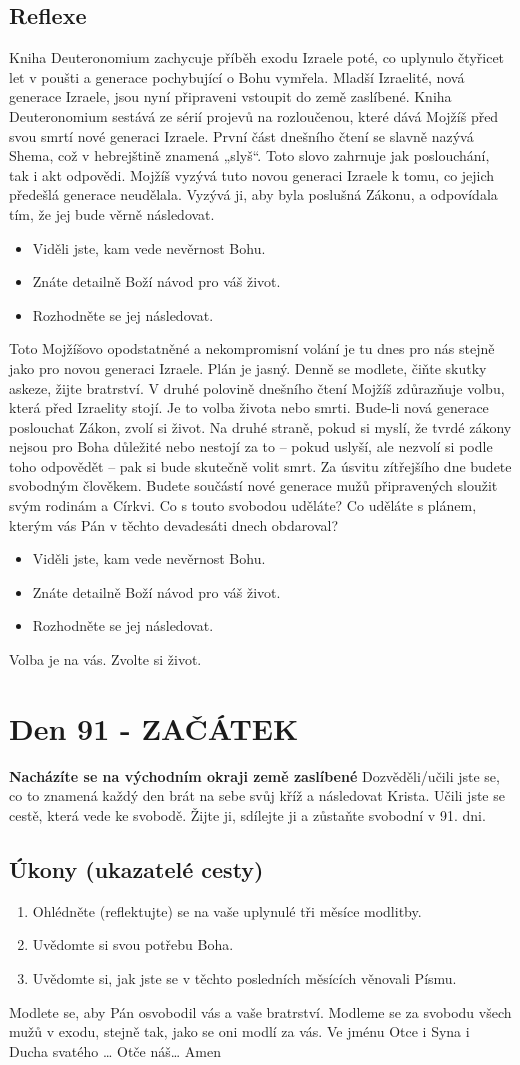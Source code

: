 \documentclass[11pt]{article}
\newcommand{\zacatekTrinactyTyden}{
\textbf{Nacházíte se na východním okraji země zaslíbené} \newline 
Dozvěděli/učili jste se, co to znamená každý den brát na sebe svůj kříž a následovat Krista. Učili jste se cestě, která vede ke svobodě. Žijte ji, sdílejte ji a zůstaňte svobodní v 91. dni.

\subsection*{Úkony (ukazatelé cesty)}
\begin{enumerate}
  \item Ohlédněte (reflektujte) se na vaše uplynulé tři měsíce modlitby.
  \item Uvědomte si svou potřebu Boha.
  \item Uvědomte si, jak jste se v těchto posledních měsících věnovali Písmu.
\end{enumerate}
Modlete se, aby Pán osvobodil vás a vaše bratrství. \newline
Modleme se za svobodu všech mužů v exodu, stejně tak, jako se oni modlí za vás.\newline
Ve jménu Otce i Syna i Ducha svatého …  Otče náš… Amen
}
\begin{document}
\subsection*{Reflexe}
Kniha Deuteronomium zachycuje příběh exodu Izraele poté, co uplynulo čtyřicet let v poušti a generace
pochybující o Bohu vymřela. Mladší Izraelité, nová generace Izraele, jsou nyní připraveni vstoupit do země
zaslíbené. Kniha Deuteronomium sestává ze sérií projevů na rozloučenou, které dává Mojžíš před svou smrtí
nové generaci Izraele.
První část dnešního čtení se slavně nazývá Shema, což v hebrejštině znamená „slyš“. Toto slovo zahrnuje jak
poslouchání, tak i akt odpovědi. Mojžíš vyzývá tuto novou generaci Izraele k tomu, co jejich předešlá
generace neudělala. Vyzývá ji, aby byla poslušná Zákonu, a odpovídala tím, že jej bude věrně následovat.
\begin{itemize}
  \item Viděli jste, kam vede nevěrnost Bohu.
  \item Znáte detailně Boží návod pro váš život.
  \item Rozhodněte se jej následovat.
\end{itemize}

Toto Mojžíšovo opodstatněné a nekompromisní volání je tu dnes pro nás stejně jako pro novou generaci
Izraele. Plán je jasný. Denně se modlete, čiňte skutky askeze, žijte bratrství.
V druhé polovině dnešního čtení Mojžíš zdůrazňuje volbu, která před Izraelity stojí. Je to volba života nebo
smrti. Bude-li nová generace poslouchat Zákon, zvolí si život. Na druhé straně, pokud si myslí, že tvrdé
zákony nejsou pro Boha důležité nebo nestojí za to – pokud uslyší, ale nezvolí si podle toho odpovědět – pak
si bude skutečně volit smrt.
Za úsvitu zítřejšího dne budete svobodným člověkem. Budete součástí nové generace mužů připravených
sloužit svým rodinám a Církvi. Co s touto svobodou uděláte? Co uděláte s plánem, kterým vás Pán v těchto
devadesáti dnech obdaroval?
\begin{itemize}
  \item Viděli jste, kam vede nevěrnost Bohu.
  \item Znáte detailně Boží návod pro váš život.
  \item Rozhodněte se jej následovat.
\end{itemize}
Volba je na vás. Zvolte si život.


\newpage
\section{Den 91 - ZAČÁTEK}
\zacatekTrinactyTyden
\end{document}

